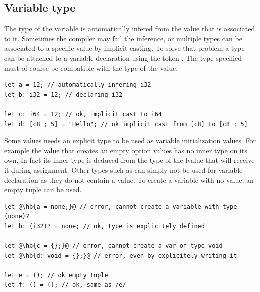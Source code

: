 \subsection{Variable type}
\label{sec:variable_type}

The type of the variable is automatically infered from the value that is
associated to it. Sometimes the compiler may fail the inference, or multiple
types can be associated to a specific value by implicit casting. To solve that
problem a type can be attached to a variable declaration using the token
\token{:}. The type specified must of course be compatible with the type of the
value.

\begin{lstlisting}[style=coloredverbatim, escapechar=@]
let a = 12; // automatically infering i32
let b: i32 = 12; // declaring i32

let c: i64 = 12; // ok, implicit cast to i64
let d: [c8 ; 5] = "Hello"; // ok implicit cast from [c8] to [c8 ; 5]
\end{lstlisting}

Some values needs an explicit type to be used as variable initialization values.
For example the value  that creates an empty option values has no
inner type on its own. In fact its inner type is deduced from the type of the
lvalue that will receive it during assignment. Other types such as 
can simply not be used for variable declaration as they do not contain a value.
To create a variable with no value, an empty tuple \token{()} can be used.

\begin{lstlisting}[style=coloredverbatimError, escapechar=@]
let @\hb{a = none;}@ // error, cannot create a variable with type (none)?
let b: (i32)? = none; // ok, type is explicitely defined

let @\hb{c = {};}@ // error, cannot create a var of type void
let @\hb{d: void = {};}@ // error, even by explicitely writing it

let e = (); // ok empty tuple
let f: () = (); // ok, same as /e/
\end{lstlisting}


\vfill%
\pagebreak
